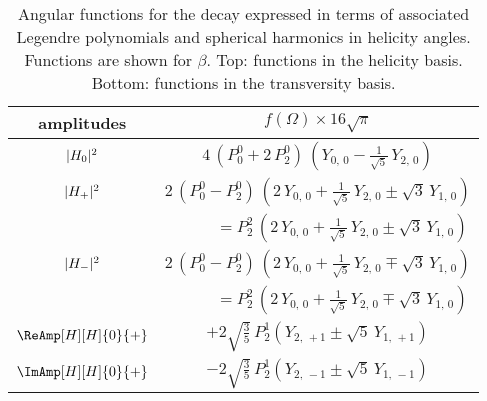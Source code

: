 \begin{table}[p]
  \centering
  \caption{Angular functions for the \BstoJpsiphi{} decay expressed in terms of associated Legendre polynomials and spherical harmonics
           in helicity angles. Functions are shown for $\beta$\texteq{}.
           Top: functions in the helicity basis. Bottom: functions in the transversity basis.}
  \label{tab:angDistJpsiphiPY}
  \renewcommand{\arraystretch}{1.2}
  \begin{tabular}{cc}
    \hline
    amplitudes                             &
      $f(\Omega) \times 16\sqrt{\pi}$      \\

    \hline

    $\AmpSq[H]{0}$  &
      $4\, (P_0^0 + 2\, P_2^0)\, (Y_{0,\,0} - \tfrac{1}{\sqrt{5}}\, Y_{2,\,0})$  \\

    $\AmpSq[H]{+}$  &
      $2\, (P_0^0 - P_2^0)\, (2\, Y_{0,\,0} + \tfrac{1}{\sqrt{5}}\, Y_{2,\,0} \pm \sqrt{3}\, Y_{1,\,0})$  \\
      &
      $\qquad\quad = P_2^2\, (2\, Y_{0,\,0} + \tfrac{1}{\sqrt{5}}\, Y_{2,\,0} \pm \sqrt{3}\, Y_{1,\,0})$  \\

    $\AmpSq[H]{-}$  &
      $2\, (P_0^0 - P_2^0)\, (2\, Y_{0,\,0} + \tfrac{1}{\sqrt{5}}\, Y_{2,\,0} \mp \sqrt{3}\, Y_{1,\,0})$  \\
      &
      $\qquad\quad = P_2^2\, (2\, Y_{0,\,0} + \tfrac{1}{\sqrt{5}}\, Y_{2,\,0} \mp \sqrt{3}\, Y_{1,\,0})$  \\

    $\ReAmp[H][H]{0}{+}$  &
      $+2\sqrt{\tfrac{3}{5}}\, P_2^1 (Y_{2,\,+1} \pm \sqrt{5}\, Y_{1,\,+1})$  \\

    $\ImAmp[H][H]{0}{+}$  &
      $-2\sqrt{\tfrac{3}{5}}\, P_2^1 (Y_{2,\,-1} \pm \sqrt{5}\, Y_{1,\,-1})$  \\


\end{tabular}
\end{table}
